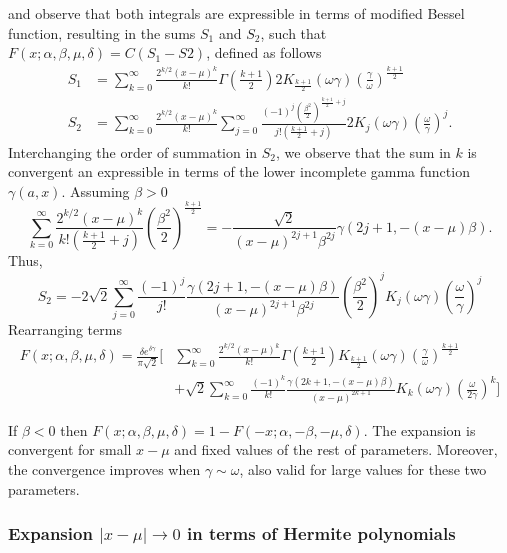 \documentclass[10pt,a4paper,oneside]{article}
\numberwithin{equation}{section}
\begin{document}
and observe that both integrals are expressible in terms of modified Bessel function, resulting in the sums $S_1$ and $S_2$, such that $F(x;\alpha, \beta, \mu, \delta) = C (S_1 - S2)$, defined as follows
\begin{align}
S_1 &= \sum_{k=0}^{\infty}\frac{2^{k/2}(x-\mu)^k}{k!} \Gamma\left(\frac{k+1}{2}\right)2 K_{\frac{k+1}{2}}(\omega \gamma) \left(\frac{\gamma}{\omega}\right)^{\frac{k+1}{2}}\\
S_2 &= \sum_{k=0}^{\infty}\frac{2^{k/2}(x-\mu)^k}{k!}\sum_{j=0}^{\infty}\frac{(-1)^j \left(\frac{\beta^2}{2}\right)^{\frac{k+1}{2}+j}}{j! (\frac{k+1}{2}+ j)} 2 K_j(\omega \gamma) \left(\frac{\omega}{\gamma}\right)^j.
\end{align}
Interchanging the order of summation in $S_2$, we observe that the sum in $k$ is convergent an expressible in terms of the lower incomplete gamma function $\gamma(a, x)$. Assuming $\beta > 0$
\begin{equation}
\sum_{k=0}^{\infty}\frac{2^{k/2}(x-\mu)^k}{k! (\frac{k+1}{2}+ j)} \left(\frac{\beta^2}{2}\right)^{\frac{k+1}{2}} = -\frac{\sqrt{2}}{(x-\mu)^{2j+1}\beta^{2j}} \gamma \left(2j + 1, -(x-\mu)\beta\right).
\end{equation}
Thus,
\begin{equation*}
S_2 = -2\sqrt{2} \sum_{j=0}^{\infty} \frac{(-1)^j}{j!}\frac{\gamma \left(2j + 1, -(x-\mu)\beta\right)}{(x-\mu)^{2j+1}\beta^{2j}} \left(\frac{\beta^2}{2}\right)^j  K_j(\omega \gamma) \left(\frac{\omega}{\gamma}\right)^j
\end{equation*}
Rearranging terms
\begin{align}
F(x;\alpha, \beta, \mu, \delta) = \frac{\delta e^{\delta \gamma}}{\pi \sqrt{2}} \bigg[& \sum_{k=0}^{\infty}\frac{2^{k/2}(x-\mu)^k}{k!} \Gamma\left(\frac{k+1}{2}\right) K_{\frac{k+1}{2}}(\omega \gamma) \left(\frac{\gamma}{\omega}\right)^{\frac{k+1}{2}}\nonumber\\
& + \sqrt{2}\sum_{k=0}^{\infty} \frac{(-1)^k}{k!}\frac{\gamma \left(2k + 1, -(x-\mu)\beta\right)}{(x-\mu)^{2k+ 1}}  K_k(\omega \gamma) \left(\frac{\omega}{2\gamma}\right)^k \bigg]
\end{align}

If $\beta < 0$ then $F(x;\alpha, \beta, \mu, \delta) = 1 - F(-x;\alpha, -\beta, -\mu, \delta)$. The expansion is convergent for small $x-\mu$ and fixed values of the rest of parameters. Moreover, the convergence improves when $\gamma \sim \omega$, also valid for large values for these two parameters.

\subsubsection{Expansion $|x-\mu| \to 0$ in terms of Hermite polynomials}
\end{document}
